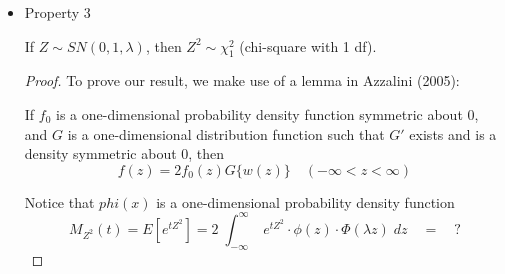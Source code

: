 \message{ !name(properties.tex)}\documentclass{article}
\begin{document}
\begin{itemize}
  With this result, we can easily show our property:

  \begin{proof}
    Let $X \sim SN(0,1,\lambda)$. Then $f_X(x) = 2 \cdot \phi(x) \cdot \Phi(\lambda x)$.

    Consider $\lim_{\lambda \to \infty} f_X(x)$. When $x$ is negative, $\lambda x \to -\infty$ and
    thus $\Phi(\lambda x) \to 0$. When $x$ is positive, however, $\lambda x \to \infty$ and
    $\Phi(\lambda x) \to 1$. Thus we have

    \[
    \lim_{\lambda \to \infty} 2 \cdot \phi(x) \cdot \Phi(\lambda x) =
    \begin{dcases*}
      0 & when $x < 0$ \\
      2 \cdot \phi(x) & when $x \geq 0$
    \end{dcases*}
    \]

    In $\lim_{\lambda \to -\infty} f_X(x)$, the signs are reversed. When $x$ is negative, $\lambda x
    \to \infty$ and $\Phi(\lambda x) \to 1$. When $x$ is positive, $\lambda x \to -\infty$ and
    $\Phi(\lambda x) \to 0$. Thus,

    \[
    \lim_{\lambda \to -\infty} 2 \cdot \phi(x) \cdot \Phi(\lambda x) =
    \begin{dcases*}
      2 \cdot \phi(x) & when $x \leq 0$ \\
      0 & when $x > 0$
    \end{dcases*}
    \]

  \end{proof}

\item Property 3
  \begin{thm*}
    If $Z \sim SN(0, 1, \lambda)$, then $Z^2 \sim \chi^2_1$ (chi-square with 1 df).
  \end{thm*}

  \begin{proof}
    To prove our result, we make use of a lemma in Azzalini (2005):

    \begin{lemma}
      If $f_0$ is a one-dimensional probability density function symmetric about 0, and $G$ is a
      one-dimensional distribution function such that $G'$ exists and is a density symmetric about
      0, then
      \[
      f(z) = 2 f_0(z) G\{w(z)\} \quad (-\infty < z < \infty)
      \]
    \end{lemma}
    Notice that $phi(x)$ is a one-dimensional probability density function
    \[
    M_{Z^2}(t) = E[e^{tZ^2}] = 2 \; \int_{-\infty}^\infty \; e^{tZ^2} \cdot \phi (z) \cdot \Phi
    (\lambda z) \; dz \quad = \quad ?
    \]
  \end{proof}


\end{itemize}
\end{document}
